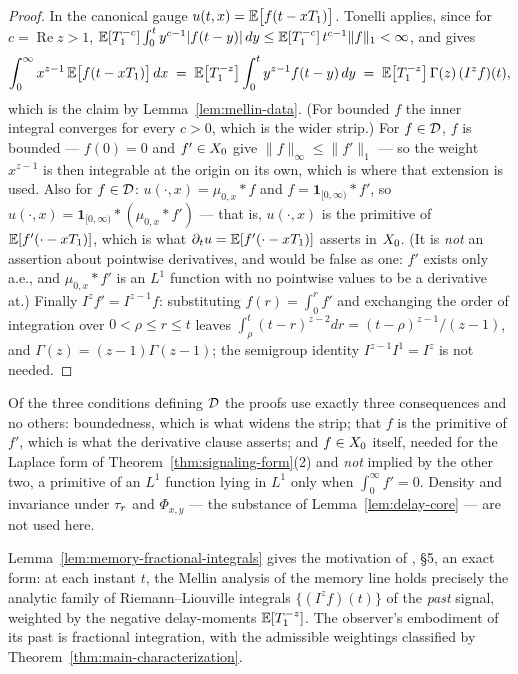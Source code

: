 \begin{proof}
In the canonical gauge $u(t, x) = \mathbb{E}\bigl[f(t - x T_1)\bigr]$. Tonelli applies, since for
$c = \operatorname{Re} z > 1$,
$\mathbb{E}[T_1^{-c}]\int_0^t y^{c-1}|f(t-y)|\,dy \le \mathbb{E}[T_1^{-c}]\, t^{c-1}\|f\|_1 < \infty$, and
gives
\[
  \int_0^\infty x^{z-1}\,\mathbb{E}\bigl[f(t - xT_1)\bigr]\,dx
  \;=\; \mathbb{E}\bigl[T_1^{-z}\bigr]\int_0^t y^{z-1} f(t - y)\,dy
  \;=\; \mathbb{E}\bigl[T_1^{-z}\bigr]\,\Gamma(z)\,(I^z f)(t),
\]
which is the claim by Lemma~\ref{lem:mellin-data}. (For bounded $f$ the inner integral
converges for every $c > 0$, which is the wider strip.) For $f \in \mathcal{D}$, $f$ is bounded ---
$f(0) = 0$ and $f' \in X_0$ give $\|f\|_\infty \le \|f'\|_1$ --- so the weight $x^{z-1}$ is then
integrable at the origin on its own, which is where that extension is used. Also for
$f \in \mathcal{D}$: $u(\cdot,x) = \mu_{0,x} * f$ and $f = \mathbf{1}_{[0,\infty)} * f'$, so
$u(\cdot,x) = \mathbf{1}_{[0,\infty)} * (\mu_{0,x} * f')$ --- that is, $u(\cdot,x)$ is the
primitive of $\mathbb{E}[f'(\cdot - xT_1)]$, which is what $\partial_t u = \mathbb{E}[f'(\cdot - xT_1)]$
asserts in $X_0$. (It is \emph{not} an assertion about pointwise derivatives, and would be
false as one: $f'$ exists only a.e., and $\mu_{0,x} * f'$ is an $L^1$ function with no
pointwise values to be a derivative at.) Finally $I^z f' = I^{z-1} f$: substituting
$f(r) = \int_0^r f'$ and exchanging the order of integration over $0 < \rho \le r \le t$
leaves $\int_\rho^t (t-r)^{z-2}dr = (t-\rho)^{z-1}/(z-1)$, and
$\Gamma(z) = (z-1)\Gamma(z-1)$; the semigroup identity $I^{z-1}I^1 = I^z$ is not needed.
\end{proof}

\begin{remark}\label{rem:core-accounting}
Of the three conditions defining $\mathcal{D}$ the proofs use exactly three consequences and no
others: boundedness, which is what widens the strip; that $f$ is the primitive of $f'$, which
is what the derivative clause asserts; and $f \in X_0$ itself, needed for the Laplace form of
Theorem~\ref{thm:signaling-form}(2) and \emph{not} implied by the other two, a primitive of an
$L^1$ function lying in $L^1$ only when $\int_0^\infty f' = 0$. Density and invariance under
$\tau_r$ and $\Phi_{x,y}$ --- the substance of Lemma~\ref{lem:delay-core} --- are not used
here.
\end{remark}

\begin{remark}\label{rem:embodiment}
Lemma~\ref{lem:memory-fractional-integrals} gives the motivation of
, \S5, an exact form: at each instant $t$, the Mellin analysis
of the memory line holds precisely the analytic family of Riemann--Liouville integrals
$\{(I^z f)(t)\}$ of the \emph{past} signal, weighted by the negative delay-moments
$\mathbb{E}[T_1^{-z}]$. The observer's embodiment of its past is fractional integration, with the
admissible weightings classified by Theorem~\ref{thm:main-characterization}.
\end{remark}

